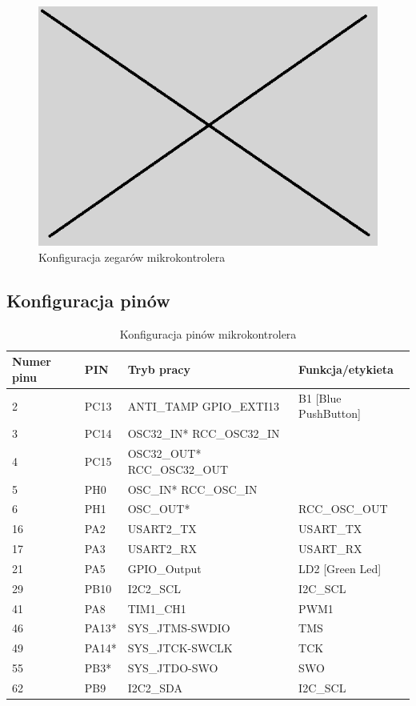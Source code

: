 \documentclass[10pt, a4paper]{article}
\begin{document}
\newpage
\begin{figure}[H]
	\centering
	\includegraphics[width=0.9\textheight,angle=90]{obraz.png}
	\caption{Konfiguracja zegarów mikrokontrolera}
	\label{fig:KonfiguracjaZegara}
\end{figure}

\subsection{Konfiguracja pinów}

\begin{table}[H]
	\centering
	\begin{tabular}{|l|l|l|l|}
		\hline
		Numer pinu	&	PIN & Tryb pracy & Funkcja/etykieta\\
		\hline
		2&	PC13 & ANTI\_TAMP	GPIO\_EXTI13	&B1 [Blue PushButton]\\
		3&	PC14 & OSC32\_IN*	RCC\_OSC32\_IN	&\\
		4&	PC15 & OSC32\_OUT*	RCC\_OSC32\_OUT	&\\
		5&	PH0&  OSC\_IN*	RCC\_OSC\_IN	&\\
		6&	PH1&  OSC\_OUT*&		RCC\_OSC\_OUT	\\
		16&	PA2&	USART2\_TX&	USART\_TX\\
		17&	PA3&	USART2\_RX&	USART\_RX\\
		21&	PA5&	GPIO\_Output&	LD2 [Green Led]\\
		29&	PB10&	I2C2\_SCL&	I2C\_SCL\\
		41&	PA8&	TIM1\_CH1&	PWM1\\
		46&	PA13*&	SYS\_JTMS-SWDIO&	TMS\\
		49&	PA14*&	SYS\_JTCK-SWCLK&	TCK\\
		55&	PB3*&	SYS\_JTDO-SWO&	SWO\\
		62&	PB9&	I2C2\_SDA&	I2C\_SCL\\
		\hline
	\end{tabular}
	\caption{Konfiguracja pinów mikrokontrolera}
	
\end{table}
\end{document}
